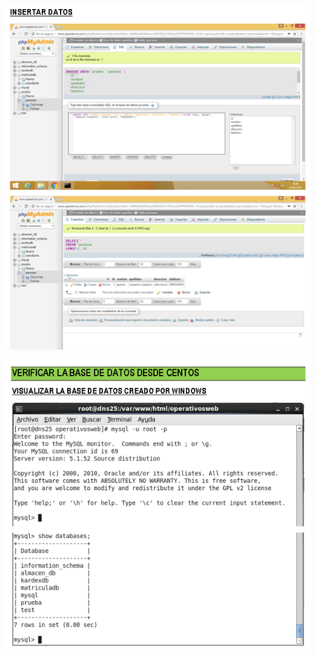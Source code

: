 \begin{itemize}
		\begin{center}
		\includegraphics[width=15cm]{./Imagenes/o}
		\end{center}
\end{itemize}

\begin{itemize}
		\begin{center}
		\includegraphics[width=15cm]{./Imagenes/p}
		\end{center}
\end{itemize}

